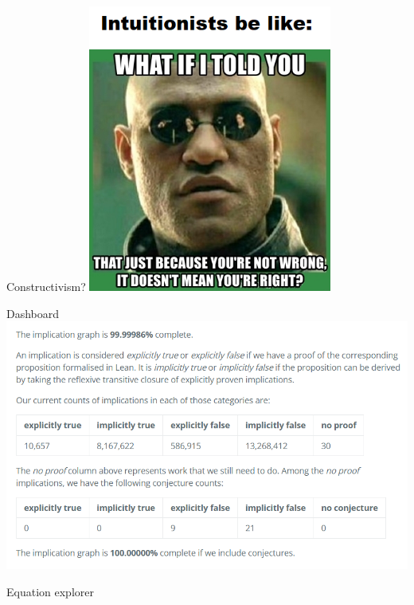 \documentclass{beamer}
\begin{document}
\begin{frame}{Constructivism?}
\includegraphics[width=0.6\textwidth]{intuitionists}
\end{frame}


\begin{frame}{Dashboard}
\includegraphics[width=\textwidth]{dashboard}
\end{frame}


\begin{frame}{Equation explorer}
\end{frame}
\end{document}

